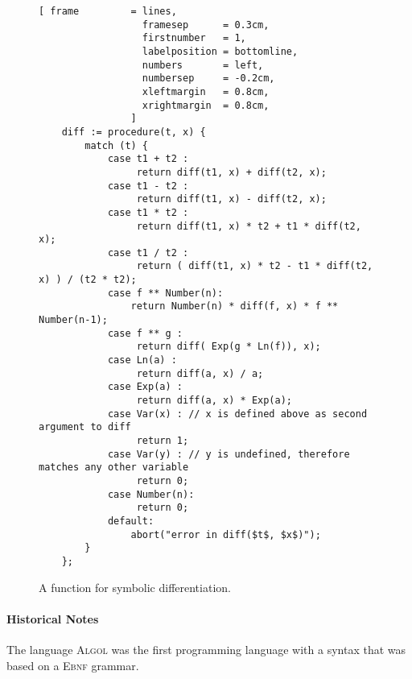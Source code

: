 \begin{figure}[!ht]
\centering
\begin{Verbatim}[ frame         = lines, 
                  framesep      = 0.3cm, 
                  firstnumber   = 1,
                  labelposition = bottomline,
                  numbers       = left,
                  numbersep     = -0.2cm,
                  xleftmargin   = 0.8cm,
                  xrightmargin  = 0.8cm,
                ]
    diff := procedure(t, x) {
        match (t) {
            case t1 + t2 :
                 return diff(t1, x) + diff(t2, x);
            case t1 - t2 :
                 return diff(t1, x) - diff(t2, x);
            case t1 * t2 :
                 return diff(t1, x) * t2 + t1 * diff(t2, x);
            case t1 / t2 :
                 return ( diff(t1, x) * t2 - t1 * diff(t2, x) ) / (t2 * t2);
            case f ** Number(n): 
                return Number(n) * diff(f, x) * f ** Number(n-1);
            case f ** g :
                 return diff( Exp(g * Ln(f)), x);
            case Ln(a) :
                 return diff(a, x) / a;
            case Exp(a) : 
                 return diff(a, x) * Exp(a);
            case Var(x) : // x is defined above as second argument to diff
                 return 1;
            case Var(y) : // y is undefined, therefore matches any other variable
                 return 0;
            case Number(n):
                 return 0;    
            default:
                abort("error in diff($t$, $x$)");
        }
    };
\end{Verbatim}
\vspace*{-0.3cm}
\caption{A function for symbolic differentiation.}
\label{fig:diff.stlx}
\end{figure}


\paragraph{Historical Notes} The language \textsc{Algol} \cite{backus:1959,naur:1960} was the first
programming language with a syntax that was based on a \textsc{Ebnf} grammar.  

